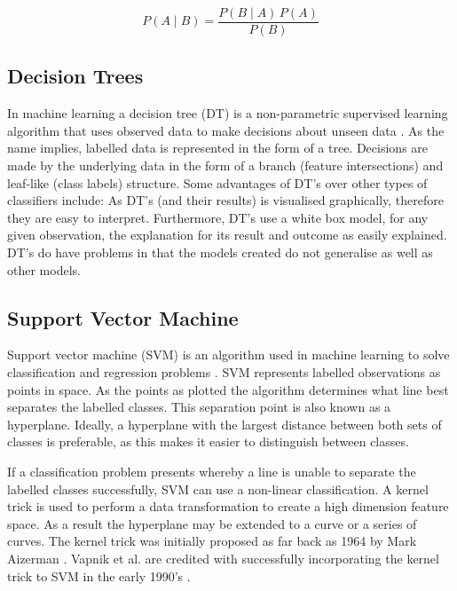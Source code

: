 \begin{equation}
P(A \mid B) = \frac{P(B \mid A) \, P(A)}{P(B)}
\end{equation}

\subsection{Decision Trees}

In machine learning a decision tree (DT) is a non-parametric supervised learning algorithm that uses observed data to make decisions about unseen data \cite{quinlan1986induction}. As the name implies, labelled data is represented in the form of a tree. Decisions are made by the underlying data in the form of a branch (feature intersections) and leaf-like (class labels) structure. Some advantages of DT's over other types of classifiers include: As DT's (and their results) is visualised graphically, therefore they are easy to interpret. Furthermore, DT's use a white box model, for any given observation, the explanation for its result and outcome as easily explained. DT's do have problems in that the models created do not generalise as well as other models.

\subsection{Support Vector Machine}

Support vector machine (SVM) is an algorithm used in machine learning to solve classification and regression problems \cite{cortes1995support}. SVM represents labelled observations as points in space. As the points as plotted the algorithm determines what line best separates the labelled classes. This separation point is also known as a hyperplane. Ideally, a hyperplane with the largest distance between both sets of classes is preferable, as this makes it easier to distinguish between classes.

If a classification problem presents whereby a line is unable to separate the labelled classes successfully, SVM can use a non-linear classification. A kernel trick is used to perform a data transformation to create a high dimension feature space. As a result the hyperplane may be extended to a curve or a series of curves. The kernel trick was initially proposed as far back as 1964 by Mark Aizerman \cite{aizerman1964theoretical}. Vapnik et al. are credited with successfully incorporating the kernel trick to SVM in the early 1990's \cite{boser1992training}. 

